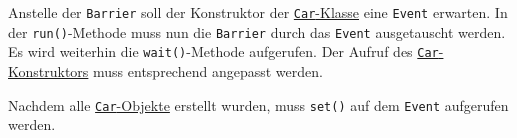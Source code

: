 Anstelle der \lstinline$Barrier$ soll der Konstruktor der \hyperref[threads:lst:auto]{\lstinline$Car$-Klasse}
eine \lstinline$Event$ erwarten.
In der \lstinline$run()$-Methode muss nun die \lstinline$Barrier$ durch das \lstinline$Event$ ausgetauscht
werden.
Es wird weiterhin die \lstinline$wait()$-Methode aufgerufen.
Der Aufruf des \hyperref[threads:lst:auto]{\lstinline$Car$-Konstruktors} muss entsprechend angepasst
werden.



Nachdem alle \hyperref[threads:lst:auto]{\lstinline$Car$-Objekte} erstellt wurden, muss \lstinline$set()$
auf dem \lstinline$Event$ aufgerufen werden.


